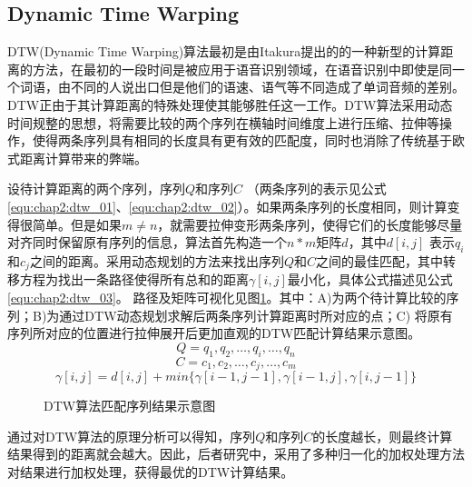 \subsection{Dynamic Time Warping}
DTW(Dynamic Time Warping)算法最初是由Itakura提出的的一种新型的计算距离的方法，在最初的一段时间是被应用于语音识别领域，在语音识别中即使是同一个词语，由不同的人说出口但是他们的语速、语气等不同造成了单词音频的差别。DTW正由于其计算距离的特殊处理使其能够胜任这一工作。DTW算法采用动态时间规整的思想，将需要比较的两个序列在横轴时间维度上进行压缩、拉伸等操作，使得两条序列具有相同的长度具有更有效的匹配度，同时也消除了传统基于欧式距离计算带来的弊端。
\par 设待计算距离的两个序列，序列$Q$和序列$C$ （两条序列的表示见公式\ref{equ:chap2:dtw_01}、\ref{equ:chap2:dtw_02}）。如果两条序列的长度相同，则计算变得很简单。但是如果$m \neq n$，就需要拉伸变形两条序列，使得它们的长度能够尽量对齐同时保留原有序列的信息，算法首先构造一个$n \ast m$矩阵$d$，其中$d[i,j]$ 表示$q_{i}$ 和$c_{j}$之间的距离。采用动态规划的方法来找出序列$Q$和$C$之间的最佳匹配，其中转移方程为找出一条路径使得所有总和的距离$\gamma[i,j]$最小化，具体公式描述见公式\ref{equ:chap2:dtw_03}。
路径及矩阵可视化见图\ref{fig:2_5}。其中：A)为两个待计算比较的序列；B)为通过DTW动态规划求解后两条序列计算距离时所对应的点；C) 将原有序列所对应的位置进行拉伸展开后更加直观的DTW匹配计算结果示意图。
\begin{equation}
\label{equ:chap2:dtw_01}
Q=q_{1},q_{2},…,q_{i},…,q_{n}
\end{equation}
\begin{equation}
\label{equ:chap2:dtw_02}
C=c_{1},c_{2},…,c_{j},…,c_{m}
\end{equation}
\begin{equation}
\label{equ:chap2:dtw_03}
\gamma[i,j]=d[i,j]+min\{\gamma[i-1,j-1],\gamma[i-1,j],\gamma[i,j-1]\}
\end{equation}
\begin{figure}[htb]
  \centering%
  \hspace{2em}%
  \hspace{2em}
  \caption{DTW算法匹配序列结果示意图}
  \label{fig:2_5}
\end{figure}
\par 通过对DTW算法的原理分析可以得知，序列$Q$和序列$C$的长度越长，则最终计算结果得到的距离就会越大。因此，后者研究中，采用了多种归一化的加权处理方法对结果进行加权处理\cite{ratanamahatana2004everything}，获得最优的DTW计算结果。

